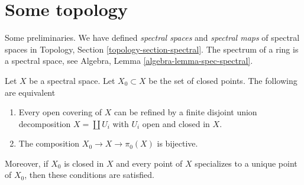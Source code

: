 \section{Some topology}
\label{section-topology}

\noindent
Some preliminaries. We have defined {\it spectral spaces} and
{\it spectral maps} of spectral spaces in
Topology, Section \ref{topology-section-spectral}.
The spectrum of a ring is a spectral space, see
Algebra, Lemma \ref{algebra-lemma-spec-spectral}.

\begin{lemma}
\label{lemma-spectral-split}
Let $X$ be a spectral space. Let $X_0 \subset X$ be the set of closed points.
The following are equivalent
\begin{enumerate}
\item Every open covering of $X$ can be refined by a finite
disjoint union decomposition $X = \coprod U_i$ with $U_i$
open and closed in $X$.
\item The composition $X_0 \to X \to \pi_0(X)$ is bijective.
\end{enumerate}
Moreover, if $X_0$ is closed in $X$ and every point of $X$ specializes
to a unique point of $X_0$, then these conditions are satisfied.
\end{lemma}

